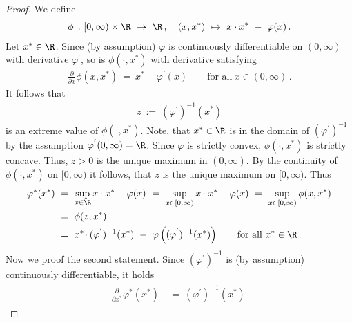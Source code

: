 \begin{proof}
We define
\begin{gather*}
 \phi
 \ 
 \colon
 [0,\infty)
 \times
 \R
 \ 
 \to
 \ 
 \R
 \,,
 \quad
 (x,x^*)
 \ 
 \mapsto
 \ 
 x\cdot x^*
 \ 
 -
 \ 
 \varphi(x)
 \,.
\end{gather*}
Let $x^*\in\R$.
Since
(by assumption)
      $\varphi$ is continuously differentiable on $(0,\infty)$ with derivative $\varphi^{'}$,
      so is $\phi(\cdot,x^*)$ with derivative
      satisfying 
      \begin{gather*}
        \frac{\partial}{\partial x}
        \phi(x,x^*)
        \ 
        =
 \ 
        x^*
        -
        \varphi^{'}(x)
        \qquad
        \text{for all}\ 
        x\in(0,\infty)
        \,.
      \end{gather*}
  It follows that 
  \begin{gather*}
    z
    \ 
    :=
    \ 
      (
    \varphi^{'}
    )^{-1}
    (x^*)
  \end{gather*}
  is an extreme value of $\phi(\cdot,x^*)$.
  Note, that $x^*\in\R$ is in the domain of 
  $
      (
    \varphi^{'}
    )^{-1}
  $
  by the assumption $\varphi^{'}(0,\infty)=\R$.
  Since $\varphi$ is strictly convex, $\phi(\cdot,x^*)$ is strictly concave. 
  Thus,
  $z>0$ is the unique maximum in $(0,\infty)$.
  By the continuity of $\phi(\cdot,x^*)$ on $[0,\infty)$ it follows, that $z$ is the unique maximum on $[0,\infty)$.
  Thus
  \begin{align*}
    \varphi^*(x^*)
    &
    \ 
    =
    \ 
    \sup_{x\in\R}
    x\cdot x^* - \varphi(x)
    \ 
    =
    \ 
    \sup_{x\in [0,\infty)}
    x\cdot x^* - \varphi(x)
    \ 
    =
    \ 
    \sup_{x\in [0,\infty)}
    \phi(x,x^*)
    \\
    &
    \ 
    =
    \ 
    \phi(z,x^*)
    \\
    &
    \ 
    =
    \ 
    x^*
    \!
    \cdot
    (
    \varphi^{'}
    )^{-1}
    (x^*)
    \ 
    -
    \ 
    \varphi
    \left( 
      (
    \varphi^{'}
    )^{-1}
    (x^*)
    \right)
    \qquad 
    \text{for all}\ 
    x^*\in\R
    \,.
  \end{align*}
  Now we proof the second statement.
  Since
  $
      (
    \varphi^{'}
    )^{-1}
  $
  is (by assumption) continuously differentiable, it holds
  \begin{align}
    \label{0098}
    \begin{split}
    \frac{\partial}{\partial x^*}
     \varphi^*(x^*)
    &
    \ 
    =
    \ 
    (
    \varphi^{'}
    )^{-1}
    (x^*)
    \ 

\end{split}
\end{align}
\end{proof}
